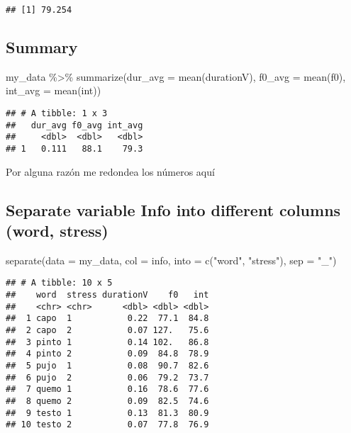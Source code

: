 \documentclass[
]{article}
\newenvironment{Shaded}{\begin{snugshade}}{\end{snugshade}}
\newcommand{\AttributeTok}[1]{\textcolor[rgb]{0.77,0.63,0.00}{#1}}
\newcommand{\FunctionTok}[1]{\textcolor[rgb]{0.00,0.00,0.00}{#1}}
\newcommand{\NormalTok}[1]{#1}
\newcommand{\SpecialCharTok}[1]{\textcolor[rgb]{0.00,0.00,0.00}{#1}}
\newcommand{\StringTok}[1]{\textcolor[rgb]{0.31,0.60,0.02}{#1}}
\begin{document}
\begin{verbatim}
## [1] 79.254
\end{verbatim}

\hypertarget{summary}{%
\subsection{Summary}\label{summary}}

\begin{Shaded}
\begin{Highlighting}[]
\NormalTok{my\_data }\SpecialCharTok{\%\textgreater{}\%} 
  \FunctionTok{summarize}\NormalTok{(}\AttributeTok{dur\_avg =} \FunctionTok{mean}\NormalTok{(durationV), }\AttributeTok{f0\_avg =} \FunctionTok{mean}\NormalTok{(f0), }\AttributeTok{int\_avg =} \FunctionTok{mean}\NormalTok{(int))}
\end{Highlighting}
\end{Shaded}

\begin{verbatim}
## # A tibble: 1 x 3
##   dur_avg f0_avg int_avg
##     <dbl>  <dbl>   <dbl>
## 1   0.111   88.1    79.3
\end{verbatim}

Por alguna razón me redondea los números aquí

\hypertarget{separate-variable-info-into-different-columns-word-stress}{%
\subsection{Separate variable Info into different columns (word,
stress)}\label{separate-variable-info-into-different-columns-word-stress}}

\begin{Shaded}
\begin{Highlighting}[]
\FunctionTok{separate}\NormalTok{(}\AttributeTok{data =}\NormalTok{ my\_data, }\AttributeTok{col =}\NormalTok{ info, }\AttributeTok{into =} \FunctionTok{c}\NormalTok{(}\StringTok{"word"}\NormalTok{, }\StringTok{"stress"}\NormalTok{), }\AttributeTok{sep =} \StringTok{"\_"}\NormalTok{)}
\end{Highlighting}
\end{Shaded}

\begin{verbatim}
## # A tibble: 10 x 5
##    word  stress durationV    f0   int
##    <chr> <chr>      <dbl> <dbl> <dbl>
##  1 capo  1           0.22  77.1  84.8
##  2 capo  2           0.07 127.   75.6
##  3 pinto 1           0.14 102.   86.8
##  4 pinto 2           0.09  84.8  78.9
##  5 pujo  1           0.08  90.7  82.6
##  6 pujo  2           0.06  79.2  73.7
##  7 quemo 1           0.16  78.6  77.6
##  8 quemo 2           0.09  82.5  74.6
##  9 testo 1           0.13  81.3  80.9
## 10 testo 2           0.07  77.8  76.9
\end{verbatim}
\end{document}
